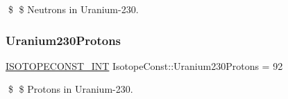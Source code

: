 \$ \$ Neutrons in Uranium-\/230. \mbox{\label{group___isotope_const-_uranium-_u230_gace1b815d1f54e24be85eeb5922dfed4d}} 
\subsubsection{\texorpdfstring{Uranium230\+Protons}{Uranium230Protons}}
{\footnotesize\ttfamily \mbox{\hyperlink{group___isotope_const-_macros_ga5f18360b3e99483a35c32d789e62621c}{I\+S\+O\+T\+O\+P\+E\+C\+O\+N\+S\+T\+\_\+\+I\+NT}} Isotope\+Const\+::\+Uranium230\+Protons = 92}

\$ \$ Protons in Uranium-\/230. 